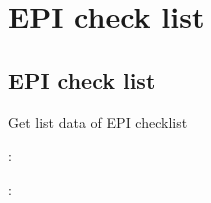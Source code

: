 \documentclass[letterpaper,10pt,english,openany,oneside]{sphinxmanual}
\begin{document}
\section{EPI check list}
\label{\detokenize{api-checklist/v1:epi-check-list}}

\subsection{EPI check list}
\label{\detokenize{api-checklist/v1:id1}}

\begin{fulllineitems}
\label{\detokenize{api-checklist/v1:post--api-checklist-v1-epi-list}}
\sphinxAtStartPar
Get list data of EPI checklist

\sphinxAtStartPar
{}:

\begin{sphinxVerbatim}[commandchars=\\\{\}]
\end{sphinxVerbatim}

\sphinxAtStartPar
{}:


\end{fulllineitems}
\end{document}

